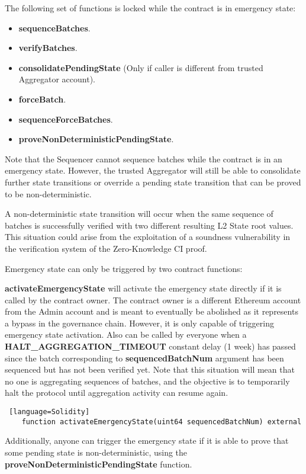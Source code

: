 The following set of functions is locked while the contract is in emergency state:

\begin{itemize}
	\item \textbf{sequenceBatches}.
	\item \textbf{verifyBatches}.
	\item \textbf{consolidatePendingState} (Only if caller is  different from trusted Aggregator account).
	\item \textbf{forceBatch}.
	\item \textbf{sequenceForceBatches}.
	\item \textbf{proveNonDeterministicPendingState}.
\end{itemize}


Note that the Sequencer cannot sequence batches while the contract is in an emergency state. However, the trusted Aggregator will still be able to consolidate further state transitions or override a pending state transition that can be proved to be non-deterministic.

A non-deterministic state transition will occur when the same sequence of batches is successfully verified with two different resulting L2 State root values. This situation could arise from the exploitation of a soundness vulnerability in the verification system of the Zero-Knowledge CI proof.

Emergency state can only be triggered by two contract functions:

\textbf{activateEmergencyState}	will activate the emergency state directly if it is called by the contract owner. The contract owner is a different Ethereum account from the Admin account and is meant to eventually be abolished as it represents a bypass in the governance chain. However, it is only capable of triggering emergency state activation. Also can be called by everyone when a \textbf{HALT\_AGGREGATION\_TIMEOUT} constant delay (1 week) has passed since the batch corresponding to \textbf{sequencedBatchNum} argument has been sequenced but has not been verified yet. Note that this situation will mean that no one is aggregating sequences of batches, and the objective is to temporarily halt the protocol until aggregation activity can resume again.
\begin{lstlisting} [language=Solidity]
	function activateEmergencyState(uint64 sequencedBatchNum) external	
\end{lstlisting}
	
Additionally, anyone can trigger the emergency state if it is able to prove that some pending state is non-deterministic, using the \textbf{proveNonDeterministicPendingState} function.

